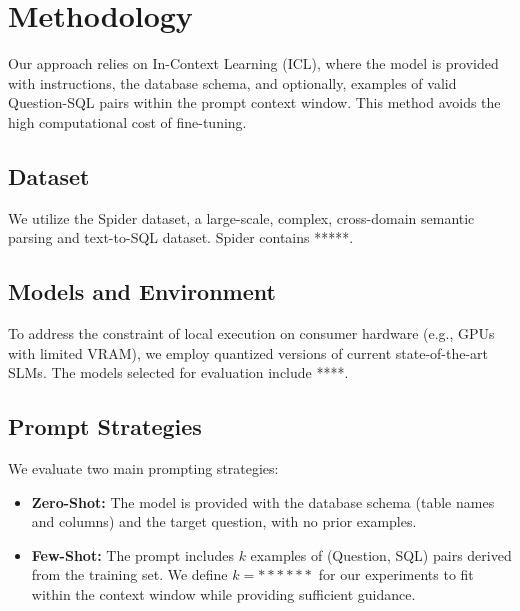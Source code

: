 \documentclass[12pt]{article}
\begin{document}
\section{Methodology} \label{sec:methodology}

Our approach relies on In-Context Learning (ICL), where the model is provided with instructions, the database schema, and optionally, examples of valid Question-SQL pairs within the prompt context window. This method avoids the high computational cost of fine-tuning.

\subsection{Dataset}
We utilize the Spider dataset, a large-scale, complex, cross-domain semantic parsing and text-to-SQL dataset. Spider contains *****.
\subsection{Models and Environment}
To address the constraint of local execution on consumer hardware (e.g., GPUs with limited VRAM), we employ quantized versions of current state-of-the-art SLMs. The models selected for evaluation include ****.

\subsection{Prompt Strategies}
We evaluate two main prompting strategies:
\begin{itemize}
    \item \textbf{Zero-Shot:} The model is provided with the database schema (table names and columns) and the target question, with no prior examples.
    \item \textbf{Few-Shot:} The prompt includes $k$ examples of (Question, SQL) pairs derived from the training set. We define $k=******$ for our experiments to fit within the context window while providing sufficient guidance.
\end{itemize}
\end{document}
